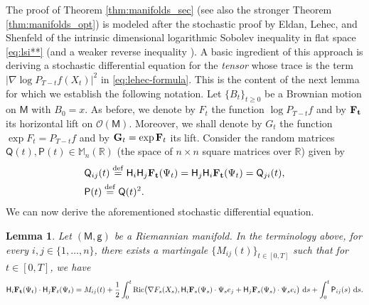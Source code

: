 \documentclass[a4paper,twoside,11pt,reqno]{amsart}
\newcommand{\eqdef}{\stackrel{\mathrm{def}}{=}}
\newtheorem{lemma}[theorem]{Lemma}
\newcommand*\diff{\mathop{}\!\mathrm{d}}
\newcommand{\R}{\mathbb{R}} %
\newcommand{\li}{\bf }
\newcommand{\MM}{\mathsf{M}}
\newcommand{\GG}{\mathsf{g}}
\newcommand{\ms}{\mathscr}
\newcommand{\msf}{\mathsf}
\newcommand{\mr}{\mathrm}
\newcommand{\HH}{\mathsf{H}}
\begin{document}
The proof of Theorem \ref{thm:manifolds_sec} (see also the stronger Theorem \ref{thm:manifolds_opt}) is modeled after the stochastic proof by Eldan, Lehec, and Shenfeld \cite{ELS20} of the intrinsic dimensional logarithmic Sobolev inequality in flat space \eqref{eq:lsi**} (and a weaker reverse inequality \cite[Theorem 3]{ELS20}). A basic ingredient of this approach is deriving a stochastic differential equation for the \emph{tensor} whose trace is the term $ \big| \nabla \log P_{T-t}f(X_t)\big|^2$ in \eqref{eq:lehec-formula}. This is the content of the next lemma for which we establish the following notation. Let $\{B_t\}_{t\geq0}$ be a Brownian motion on $\MM$ with $B_0=x$.  As before, we denote by $F_t$ the function $\log P_{T-t}f$ and by ${\li F_t}$ its horizontal lift on $\ms{O}(\MM)$. Moreover, we shall denote by $G_t$ the function $\exp F_t=P_{T-t}f$ and by ${\li G}_t = \exp {\li F}_t$ its lift. Consider the random matrices $\msf{Q}(t),\msf{P}(t)\in\mathbb M_n(\R)$ (the space of $n\times n$ square matrices over $\R$) given by
\begin{align}\label{eq:Qdef}
\begin{split}
&\msf{Q}_{ij}(t) \eqdef \HH_i\HH_j {\li F_t}(\Psi_t) = \HH_j\HH_i {\li F_t}(\Psi_t) = \msf{Q}_{ji}(t),\\
&\msf{P}(t)\eqdef\msf{Q}(t)^2.
\end{split}
\end{align}
We can now derive the aforementioned stochastic differential equation.

\begin{lemma} \label{lem:Q}
Let $(\MM,\GG)$ be a Riemannian manifold. In the terminology above, for every $i,j\in\{1,\ldots,n\}$, there exists a martingale $\{M_{ij}(t)\}_{t\in[0,T]}$ such that for $t\in[0,T]$, we have
\begin{equation*}
\HH_i{\li F_t}(\Psi_t) \cdot \HH_j{\li F}_t(\Psi_t) = M_{ij}(t) +\frac{1}{2} \int_0^t \mr{Ric}\big( \nabla F_s(X_s), \HH_i {\li F}_s(\Psi_s) \cdot \Psi_s e_j + \HH_j {\li F}_s(\Psi_s) \cdot \Psi_s e_i \big)\, \diff s + \int_0^t \msf{P}_{ij}(s) \, \diff s.
\end{equation*}
\end{lemma}
\end{document}
